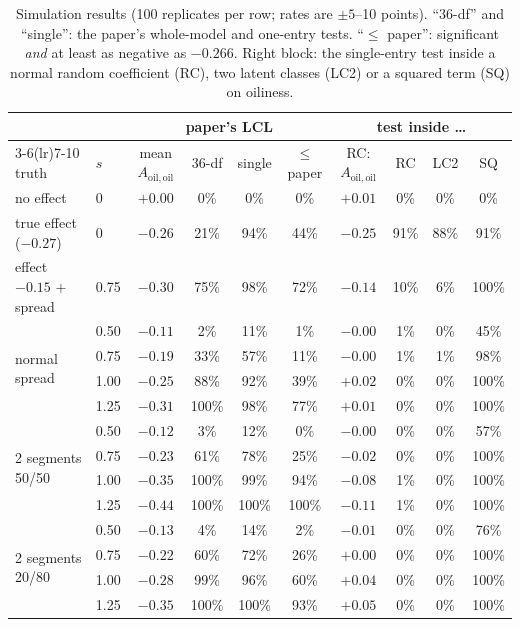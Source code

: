 \documentclass[11pt,a4paper]{article}
\theoremstyle{remark}
\newcommand{\Aoo}{A_{\mathrm{oil,oil}}}
\begin{document}
\begin{table}[!htbp]
\centering\small
\setlength{\tabcolsep}{4.5pt}
\begin{tabular}{llcccccccc}
\toprule
 & & \multicolumn{4}{c}{paper's LCL} & \multicolumn{4}{c}{test inside \dots}\\
\cmidrule(lr){3-6}\cmidrule(lr){7-10}
truth & $s$ & mean $\Aoo$ & 36-df & single & $\le$ paper & RC: $\Aoo$ & RC & LC2 & SQ\\
\midrule
no effect & 0 & $+0.00$ & 0\% & 0\% & 0\% & $+0.01$ & 0\% & 0\% & 0\%\\
true effect ($-0.27$) & 0 & $-0.26$ & 21\% & 94\% & 44\% & $-0.25$ & 91\% & 88\% & 91\%\\
effect $-0.15$ + spread & 0.75 & $-0.30$ & 75\% & 98\% & 72\% & $-0.14$ & 10\% & 6\% & 100\%\\
\midrule
\multirow{4}{*}{normal spread} & 0.50 & $-0.11$ & 2\% & 11\% & 1\% & $-0.00$ & 1\% & 0\% & 45\%\\
 & 0.75 & $-0.19$ & 33\% & 57\% & 11\% & $-0.00$ & 1\% & 1\% & 98\%\\
 & 1.00 & $-0.25$ & 88\% & 92\% & 39\% & $+0.02$ & 0\% & 0\% & 100\%\\
 & 1.25 & $-0.31$ & 100\% & 98\% & 77\% & $+0.01$ & 0\% & 0\% & 100\%\\
\midrule
\multirow{4}{*}{2 segments 50/50} & 0.50 & $-0.12$ & 3\% & 12\% & 0\% & $-0.00$ & 0\% & 0\% & 57\%\\
 & 0.75 & $-0.23$ & 61\% & 78\% & 25\% & $-0.02$ & 0\% & 0\% & 100\%\\
 & 1.00 & $-0.35$ & 100\% & 99\% & 94\% & $-0.08$ & 1\% & 0\% & 100\%\\
 & 1.25 & $-0.44$ & 100\% & 100\% & 100\% & $-0.11$ & 1\% & 0\% & 100\%\\
\midrule
\multirow{4}{*}{2 segments 20/80} & 0.50 & $-0.13$ & 4\% & 14\% & 2\% & $-0.01$ & 0\% & 0\% & 76\%\\
 & 0.75 & $-0.22$ & 60\% & 72\% & 26\% & $+0.00$ & 0\% & 0\% & 100\%\\
 & 1.00 & $-0.28$ & 99\% & 96\% & 60\% & $+0.04$ & 0\% & 0\% & 100\%\\
 & 1.25 & $-0.35$ & 100\% & 100\% & 93\% & $+0.05$ & 0\% & 0\% & 100\%\\
\bottomrule
\end{tabular}
\caption{Simulation results (100 replicates per row; rates are $\pm5$--10 points). ``36-df'' and ``single'':
the paper's whole-model and one-entry tests. ``$\le$ paper'': significant \emph{and} at least as negative
as $-0.266$. Right block: the single-entry test inside a normal random coefficient (RC), two latent
classes (LC2) or a squared term (SQ) on oiliness.}
\label{tab:sim}
\end{table}
\end{document}
